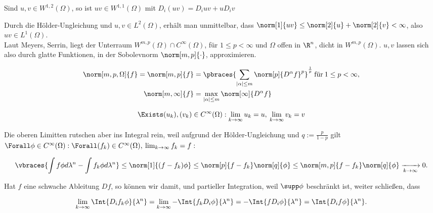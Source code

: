 \begin{exercise}

Sind $u,v \in W^{1,2}(\Omega)$, so ist $uv \in W^{1,1}(\Omega)$ mit $D_i(uv) = D_iuv + uD_iv$

\end{exercise}

\begin{solution}

Durch die Hölder-Ungleichung und $u, v \in L^2(\Omega)$, erhält man unmittelbar, dass $\norm[1]{uv} \leq \norm[2]{u} + \norm[2]{v} < \infty$, also $uv \in L^1(\Omega)$. \\

Laut Meyers, Serrin, liegt der Unterraum $W^{m, p}(\Omega) \cap C^\infty(\Omega)$, für $1 \leq p < \infty$ und $\Omega$ offen in $\R^n$, dicht in $W^{m, p}(\Omega)$. $u, v$ lassen sich also durch glatte Funktionen, in der Sobolevnorm $\norm[m, p]{\cdot}$, approximieren.

\begin{align*}
  \norm[m, p, \Omega]{f} =
  \norm[m, p]{f} & =
  \pbraces
  {
    \sum_{|\alpha| \leq m}
    \norm[p]{D^\alpha f}^p
  }^\frac{1}{p} \:
  \text{für} \:
  1 \leq p < \infty, \\
  \norm[m, \infty]{f} & =
  \max_{|\alpha| \leq m}
  \norm[\infty]{D^\alpha f}
\end{align*}

\begin{align*}
  \Exists (u_k), (v_k) \in C^\infty(\Omega):
  \lim_{k \to \infty} u_k = u, \:
  \lim_{k \to \infty} v_k = v
\end{align*}

Die oberen Limitten rutschen aber ins Integral rein, weil aufgrund der Hölder-Ungleichung und $q := \frac{p}{1 - p}$ gilt $\Forall \phi \in C^\infty(\Omega): \Forall (f_k) \in C^\infty(\Omega), \: \lim_{k \to \infty} f_k = f:$

\begin{align*}
  \vbraces
  {
    \int f         \phi d \lambda^n -
    \int f_k       \phi d \lambda^n
  } \leq
  \norm[1]{(f - f_k) \phi} \leq
  \norm[p]{f - f_k}
  \norm[q]{\phi} \leq
  \norm[m, p]{f - f_k}
  \norm[q]{\phi}
  \xrightarrow[k \to \infty]{} 0.
\end{align*}

Hat $f$ eine schwache Ableitung $Df$, so können wir damit, und partieller Integration, weil $\supp \phi$ beschränkt ist, weiter schließen, dass

\begin{align*}
  \lim_{k \to \infty}   \Int{D_i f_k \phi}{\lambda^n} =
  \lim_{k \to \infty} - \Int{f_k D_i \phi}{\lambda^n} =
  - \Int{f D_i \phi}{\lambda^n} =
    \Int{D_i f \phi}{\lambda^n}.
\end{align*}


\end{solution}
